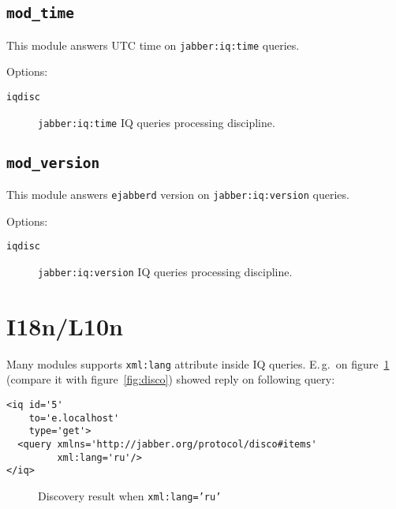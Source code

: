 \documentclass[10pt]{article}
\newcommand{\imgscale}{0.58}
\newcommand{\insimg}[1]{\insscaleimg{\imgscale}{#1}}
\newcommand{\insscaleimg}[2]{
  \imgsrc{#2}{}
  \begin{latexonly}
    \scalebox{#1}{\texttt{[image: \#2]}}
  \end{latexonly}
}
\newcommand{\ns}[1]{\texttt{#1}}
\newcommand{\ejabberd}{\texttt{ejabberd}}
\newcommand{\modtime}{\texttt{mod\_time}}
\newcommand{\modversion}{\texttt{mod\_version}}
\begin{document}
\subsection{\modtime{}}
\label{sec:modtime}

This module answers UTC time on \ns{jabber:iq:time} queries.

Options:
\begin{description}
\item[\texttt{iqdisc}] \ns{jabber:iq:time} IQ queries processing discipline.
\end{description}


\subsection{\modversion{}}
\label{sec:modversion}

This module answers \ejabberd{} version on \ns{jabber:iq:version} queries.

Options:
\begin{description}
\item[\texttt{iqdisc}] \ns{jabber:iq:version} IQ queries processing discipline.
\end{description}




\section{I18n/L10n}
\label{sec:i18nl10n}

Many modules supports \texttt{xml:lang} attribute inside IQ queries.  E.\,g.\ 
on figure~\ref{fig:discorus} (compare it with figure~\ref{fig:disco}) showed
reply on following query:
\begin{verbatim}
<iq id='5'
    to='e.localhost'
    type='get'>
  <query xmlns='http://jabber.org/protocol/disco#items'
         xml:lang='ru'/>
</iq>
\end{verbatim}

\begin{figure}[htbp]
  \centering
  \insimg{discorus.png}
  \caption{Discovery result when \texttt{xml:lang='ru'}}
  \label{fig:discorus}
\end{figure}
\end{document}
